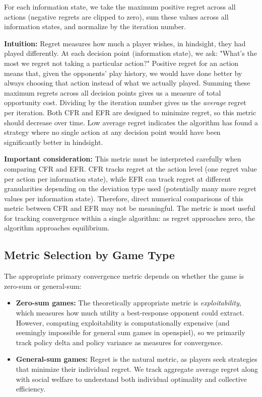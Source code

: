 \documentclass[11pt]{article}
\begin{document}
For each information state, we take the maximum positive regret across all actions (negative regrets are clipped to zero), sum these values across all information states, and normalize by the iteration number.

\textbf{Intuition:} Regret measures how much a player wishes, in hindsight, they had played differently. At each decision point (information state), we ask: "What's the most we regret not taking a particular action?" Positive regret for an action means that, given the opponents' play history, we would have done better by always choosing that action instead of what we actually played. Summing these maximum regrets across all decision points gives us a measure of total opportunity cost. Dividing by the iteration number gives us the \emph{average} regret per iteration. Both CFR and EFR are designed to minimize regret, so this metric should decrease over time. Low average regret indicates the algorithm has found a strategy where no single action at any decision point would have been significantly better in hindsight.

\textbf{Important consideration:} This metric must be interpreted carefully when comparing CFR and EFR. CFR tracks regret at the action level (one regret value per action per information state), while EFR can track regret at different granularities depending on the deviation type used (potentially many more regret values per information state). Therefore, direct numerical comparisons of this metric between CFR and EFR may not be meaningful. The metric is most useful for tracking convergence within a single algorithm: as regret approaches zero, the algorithm approaches equilibrium.

\subsection{Metric Selection by Game Type}

The appropriate primary convergence metric depends on whether the game is zero-sum or general-sum:

\begin{itemize}
    \item \textbf{Zero-sum games:} The theoretically appropriate metric is \emph{exploitability}, which measures how much utility a best-response opponent could extract. However, computing exploitability is computationally expensive (and seemingly impossible for general sum games in openspiel), so we primarily track policy delta and policy variance as measures for convergence.
    
    \item \textbf{General-sum games:} Regret is the natural metric, as players seek strategies that minimize their individual regret. We track aggregate average regret along with social welfare to understand both individual optimality and collective efficiency.
\end{itemize}
\end{document}
